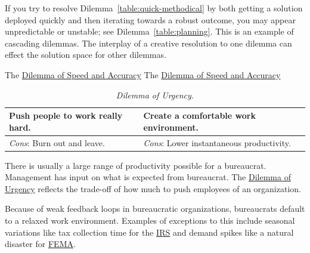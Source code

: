 If you try to resolve Dilemma~\ref{table:quick-methodical} by both getting a solution deployed quickly and then iterating towards a robust outcome, you may appear unpredictable or unstable; see Dilemma~\ref{table:planning}. This is an example of cascading dilemmas. The interplay of a creative resolution to one dilemma can effect the solution space for other dilemmas. 

The \href{table:quick-methodical}{Dilemma of Speed and Accuracy}
The \href{table:quick-methodical}{Dilemma of Speed and Accuracy}


\begin{center}
\begin{table}[H] %
\begin{tabular}{ | m{\dilemmatablewidth}| m{\dilemmatablewidth} | } 
  \hline
  \textbf{Push people to work really hard.} & 
  \textbf{Create a comfortable work environment.} \\ 
  \hline
  \textit{Cons}: Burn out and leave. & 
  \textit{Cons}: Lower instantaneous productivity. \\  
  \hline
\end{tabular}
\caption{
\textit{Dilemma of Urgency.}
}
\label{table:rate-of-work}
\end{table}
\end{center}

There is usually a large range of productivity possible for a bureaucrat. Management has input on what is expected from bureaucrat. The \href{table:rate-of-work}{Dilemma of Urgency} reflects the trade-off of how much to push employees of an organization. 


Because of weak feedback loops in bureaucratic organizations, bureaucrats default to a relaxed work environment. Examples of exceptions to this include seasonal variations like tax collection time for the \href{https://en.wikipedia.org/wiki/Internal_Revenue_Service}{IRS} and demand spikes like a natural disaster for \href{https://en.wikipedia.org/wiki/Federal_Emergency_Management_Agency}{FEMA}. 

